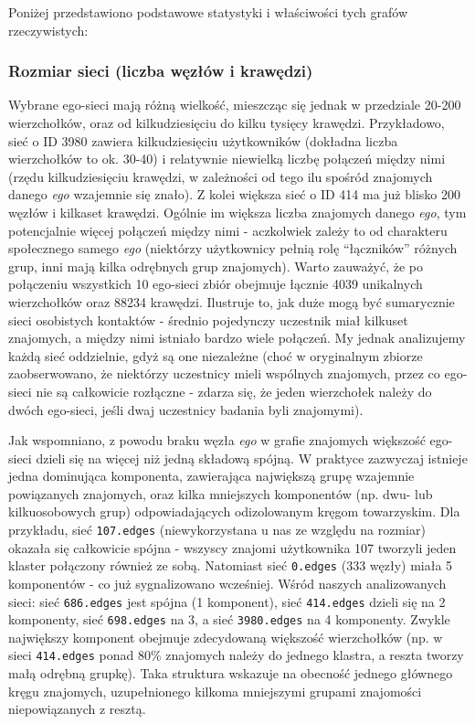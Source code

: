 Poniżej przedstawiono podstawowe statystyki i właściwości tych grafów rzeczywistych:

\subsubsection{Rozmiar sieci (liczba węzłów i krawędzi)}
Wybrane ego-sieci mają różną wielkość, mieszcząc się jednak w przedziale 20-200 wierzchołków, oraz od kilkudziesięciu do kilku tysięcy krawędzi. Przykładowo, sieć o ID 3980 zawiera kilkudziesięciu użytkowników (dokładna liczba wierzchołków to ok. 30-40) i relatywnie niewielką liczbę połączeń między nimi (rzędu kilkudziesięciu krawędzi, w zależności od tego ilu spośród znajomych danego \textit{ego} wzajemnie się znało). Z kolei większa sieć o ID 414 ma już blisko 200 węzłów i kilkaset krawędzi. Ogólnie im większa liczba znajomych danego \textit{ego}, tym potencjalnie więcej połączeń między nimi - aczkolwiek zależy to od charakteru społecznego samego \textit{ego} (niektórzy użytkownicy pełnią rolę ``łączników'' różnych grup, inni mają kilka odrębnych grup znajomych). Warto zauważyć, że po połączeniu wszystkich 10 ego-sieci zbiór obejmuje łącznie 4039 unikalnych wierzchołków oraz 88234 krawędzi. Ilustruje to, jak duże mogą być sumarycznie sieci osobistych kontaktów - średnio pojedynczy uczestnik miał kilkuset znajomych, a między nimi istniało bardzo wiele połączeń. My jednak analizujemy każdą sieć oddzielnie, gdyż są one niezależne (choć w oryginalnym zbiorze zaobserwowano, że niektórzy uczestnicy mieli wspólnych znajomych, przez co ego-sieci nie są całkowicie rozłączne - zdarza się, że jeden wierzchołek należy do dwóch ego-sieci, jeśli dwaj uczestnicy badania byli znajomymi).

Jak wspomniano, z powodu braku węzła \textit{ego} w grafie znajomych większość ego-sieci dzieli się na więcej niż jedną składową spójną. W praktyce zazwyczaj istnieje jedna dominująca komponenta, zawierająca największą grupę wzajemnie powiązanych znajomych, oraz kilka mniejszych komponentów (np. dwu- lub kilkuosobowych grup) odpowiadających odizolowanym kręgom towarzyskim. Dla przykładu, sieć \verb|107.edges| (niewykorzystana u nas ze względu na rozmiar) okazała się całkowicie spójna - wszyscy znajomi użytkownika 107 tworzyli jeden klaster połączony również ze sobą. Natomiast sieć \verb|0.edges| (333 węzły) miała 5 komponentów - co już sygnalizowano wcześniej. Wśród naszych analizowanych sieci: sieć \verb|686.edges| jest spójna (1 komponent), sieć \verb|414.edges| dzieli się na 2 komponenty, sieć \verb|698.edges| na 3, a sieć \verb|3980.edges| na 4 komponenty. Zwykle największy komponent obejmuje zdecydowaną większość wierzchołków (np. w sieci \verb|414.edges| ponad 80\% znajomych należy do jednego klastra, a reszta tworzy małą odrębną grupkę). Taka struktura wskazuje na obecność jednego głównego kręgu znajomych, uzupełnionego kilkoma mniejszymi grupami znajomości niepowiązanych z resztą.

